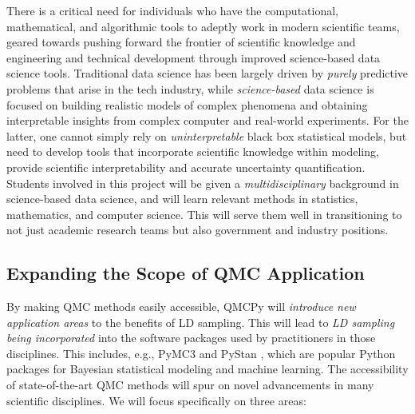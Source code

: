 \documentclass[11pt]{NSFamsart}
\newcommand{\cmtS}[1]{{\color{blue}{(Simon: #1)}}}
\begin{document}
There is a critical need for individuals who have the computational, mathematical, and algorithmic tools to adeptly work in modern scientific teams, geared towards pushing forward the frontier of scientific knowledge and engineering and technical development through improved science-based data science tools.  Traditional data science has been largely driven by \textit{purely} predictive problems that arise in the tech industry, while \textit{science-based} data science is focused on building realistic models of complex phenomena and obtaining interpretable insights from complex computer and real-world experiments. For the latter, one cannot simply rely on \textit{uninterpretable} black box statistical models, but need to develop tools that incorporate scientific knowledge within modeling, provide scientific interpretability and accurate uncertainty quantification.  Students involved in this project will be given a \textit{multidisciplinary} background in science-based data science, and will learn relevant methods in statistics, mathematics, and computer science.  This will serve them well in transitioning to not just academic research teams but also government and industry positions.



\subsection{Expanding the Scope of QMC Application} \label{sec:scopeapplication} \cmtS{will revise, make more focused on specific scientific applications} By making QMC methods easily accessible, QMCPy will \emph{introduce new application areas} to the benefits of LD sampling.  This will lead to \emph{LD sampling being incorporated} into the software packages used by practitioners in those disciplines. This includes, e.g., PyMC3 \citep{salvatier2016probabilistic} and PyStan \citep{stan2017pystan}, which are popular Python packages for Bayesian statistical modeling and machine learning. The accessibility of state-of-the-art QMC methods will spur on novel advancements in many scientific disciplines. We will focus specifically on three areas:
\end{document}
